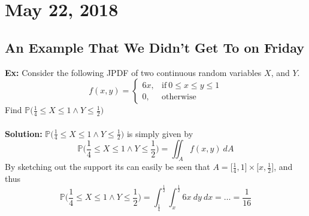 \documentclass{article}
\newcommand{\bbP}{\mathbb{P}}
\newcommand{\exx}{\textbf{Ex: }}
\newcommand{\soln}{\textbf{Solution: }}
\begin{document}

\section{May 22, 2018}
\subsection{An Example That We Didn't Get To on Friday}
\exx Consider the following JPDF of two continuous random variables $X$, and $Y$.
\[
f(x, y) =
\begin{cases}
	6x, &\text{if}\ 0 \leq x \leq y \leq 1\\
	0, &\text{otherwise}
\end{cases}
\]
Find $\bbP\big(\frac{1}{4} \leq X \leq 1 \wedge Y \leq \frac{1}{2}\big)$\\\\
\soln $\bbP\big(\frac{1}{4} \leq X \leq 1 \wedge Y \leq \frac{1}{2}\big)$ is simply given by
\[\bbP\bigg(\frac{1}{4} \leq X \leq 1 \wedge Y \leq \frac{1}{2}\bigg) = \iint_{A}f(x, y)\ dA\]
By sketching out the support its can easily be seen that $A = \big[\frac{1}{4}, 1\big]\times\big[x, \frac{1}{2}\big]$, and thus
\[\bbP\bigg(\frac{1}{4} \leq X \leq 1 \wedge Y \leq \frac{1}{2}\bigg) = \int_{\frac{1}{4}}^{\frac{1}{2}} \int_{x}^{\frac{1}{2}}6x\ dy\ dx = \dots = \frac{1}{16}\]
\end{document}
